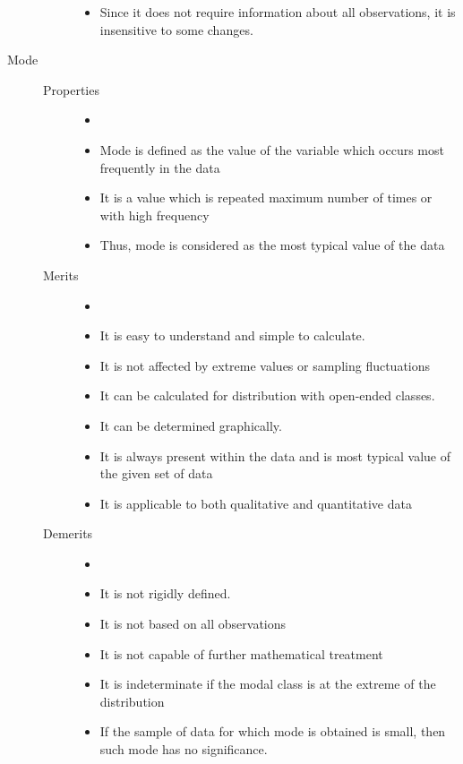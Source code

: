 \documentclass[
10pt, %
a4paper, %
]{report}
\begin{document}
\begin{description}
\begin{description}
\begin{itemize}
\item Since it does not require information about all observations, it is insensitive to some changes.
\end{itemize}
\end{description}
\item[Mode]
\begin{description}
\item[]
\item[Properties]
\begin{itemize}
\item[]
\item Mode is defined as the value of the variable which occurs most frequently in the data
\item It is a value which is repeated maximum number of times or with high frequency
\item Thus, mode is considered as the most typical value of the data
\end{itemize}
\item[Merits]
\begin{itemize}
\item[]
\item It is easy to understand and simple to calculate.
\item It is not affected by extreme values or sampling fluctuations
\item It can be calculated for distribution with open-ended classes.
\item It can be determined graphically.
\item It is always present within the data and is most typical value of the given set of data
\item It is applicable to both qualitative and quantitative data
\end{itemize}
\item[Demerits]
\begin{itemize}
\item[]
\item It is not rigidly defined.
\item It is not based on all observations
\item It is not capable of further mathematical treatment
\item It is indeterminate if the modal class is at the extreme of the distribution
\item If the sample of data for which mode is obtained is small, then such mode has no significance.
\end{itemize}
\end{description}
\end{description}
\end{document}
